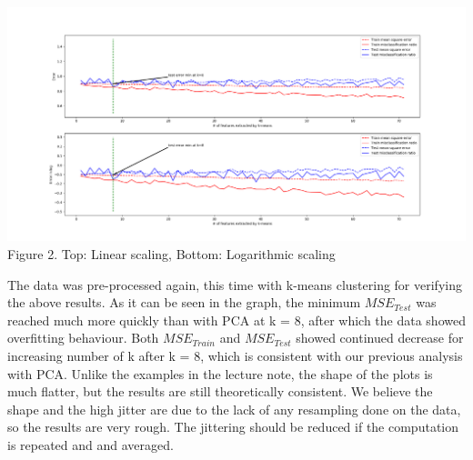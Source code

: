 \documentclass[12pt]{article}
\begin{document}
\begin{center}
    \includegraphics[scale=0.25]{kmeans.png}\\
    Figure 2. Top: Linear scaling, Bottom: Logarithmic scaling    
\end{center}
    The data was pre-processed again, this time with k-means clustering for verifying the above results. As it can be seen in the graph, the minimum $MSE_{Test}$ was reached much more quickly than with PCA at k = 8, after which the data showed overfitting behaviour. Both $MSE_{Train}$ and $MSE_{Test}$ showed continued decrease for increasing number of k after k = 8, which is consistent with our previous analysis with PCA. Unlike the examples in the lecture note, the shape of the plots is much flatter, but the results are still theoretically consistent. We believe the shape and the high jitter are due to the lack of any resampling done on the data, so the results are very rough. The jittering should be reduced if the computation is repeated and and averaged. 
\end{document}
